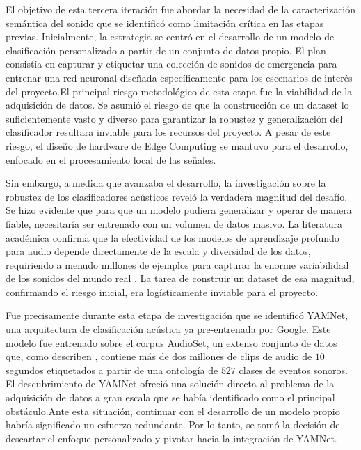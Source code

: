 

El objetivo de esta tercera iteración fue abordar la necesidad de la caracterización semántica del sonido que se identificó como limitación crítica en las etapas previas. Inicialmente, la estrategia se centró en el desarrollo de un modelo de clasificación personalizado a partir de un conjunto de datos propio. El plan consistía en capturar y etiquetar una colección de sonidos de emergencia para entrenar una red neuronal diseñada específicamente para los escenarios de interés del proyecto.El principal riesgo metodológico de esta etapa fue la viabilidad de la adquisición de datos. Se asumió el riesgo de que la construcción de un dataset lo suficientemente vasto y diverso para garantizar la robustez y generalización del clasificador resultara inviable para los recursos del proyecto. A pesar de este riesgo, el diseño de hardware de Edge Computing se mantuvo para el desarrollo, enfocado en el procesamiento local de las señales.

Sin embargo, a medida que avanzaba el desarrollo, la investigación sobre la robustez de los clasificadores acústicos reveló la verdadera magnitud del desafío. Se hizo evidente que para que un modelo pudiera generalizar y operar de manera fiable, necesitaría ser entrenado con un volumen de datos masivo. La literatura académica confirma que la efectividad de los modelos de aprendizaje profundo para audio depende directamente de la escala y diversidad de los datos, requiriendo a menudo millones de ejemplos para capturar la enorme variabilidad de los sonidos del mundo real \cite{gemmeke2017audio}. La tarea de construir un dataset de esa magnitud, confirmando el riesgo inicial, era logísticamente inviable para el proyecto.

Fue precisamente durante esta etapa de investigación que se identificó YAMNet, una arquitectura de clasificación acústica ya pre-entrenada por Google. Este modelo fue entrenado sobre el corpus AudioSet, un extenso conjunto de datos que, como describen \citeauthor{gemmeke2017audio} \citeyear{gemmeke2017audio}, contiene más de dos millones de clips de audio de $10$ segundos etiquetados a partir de una ontología de $527$ clases de eventos sonoros. El descubrimiento de YAMNet ofreció una solución directa al problema de la adquisición de datos a gran escala que se había identificado como el principal obstáculo.Ante esta situación, continuar con el desarrollo de un modelo propio habría significado un esfuerzo redundante. Por lo tanto, se tomó la decisión de descartar el enfoque personalizado y pivotar hacia la integración de YAMNet. 

